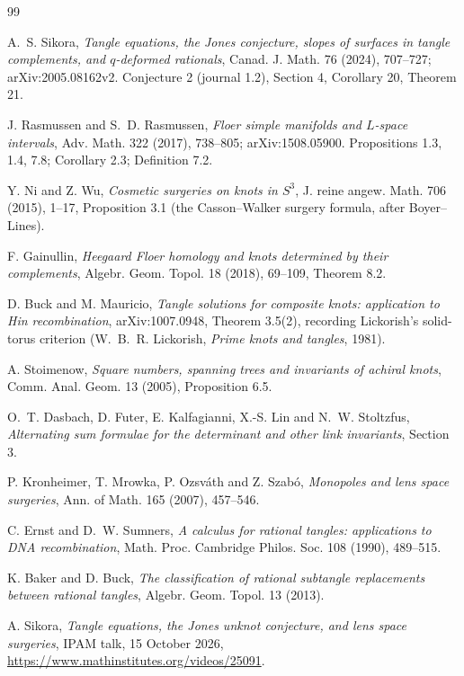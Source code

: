 \documentclass[11pt]{amsart}
\theoremstyle{remark}
\begin{document}
\begin{thebibliography}{99}

 A.~S. Sikora, \emph{Tangle equations, the Jones conjecture, slopes of surfaces in tangle complements, and $q$-deformed rationals}, Canad. J. Math. 76 (2024), 707--727; arXiv:2005.08162v2. Conjecture 2 (journal 1.2), Section 4, Corollary 20, Theorem 21.

 J. Rasmussen and S.~D. Rasmussen, \emph{Floer simple manifolds and $L$-space intervals}, Adv. Math. 322 (2017), 738--805; arXiv:1508.05900. Propositions 1.3, 1.4, 7.8; Corollary 2.3; Definition 7.2.

 Y. Ni and Z. Wu, \emph{Cosmetic surgeries on knots in $S^3$}, J. reine angew. Math. 706 (2015), 1--17, Proposition 3.1 (the Casson--Walker surgery formula, after Boyer--Lines).

 F. Gainullin, \emph{Heegaard Floer homology and knots determined by their complements}, Algebr. Geom. Topol. 18 (2018), 69--109, Theorem 8.2.

 D. Buck and M. Mauricio, \emph{Tangle solutions for composite knots: application to Hin recombination}, arXiv:1007.0948, Theorem 3.5(2), recording Lickorish's solid-torus criterion (W.~B.~R. Lickorish, \emph{Prime knots and tangles}, 1981).

 A. Stoimenow, \emph{Square numbers, spanning trees and invariants of achiral knots}, Comm. Anal. Geom. 13 (2005), Proposition 6.5.

 O.~T. Dasbach, D. Futer, E. Kalfagianni, X.-S. Lin and N.~W. Stoltzfus, \emph{Alternating sum formulae for the determinant and other link invariants}, Section 3.

 P. Kronheimer, T. Mrowka, P. Ozsv\'ath and Z. Szab\'o, \emph{Monopoles and lens space surgeries}, Ann. of Math. 165 (2007), 457--546.

 C. Ernst and D.~W. Sumners, \emph{A calculus for rational tangles: applications to DNA recombination}, Math. Proc. Cambridge Philos. Soc. 108 (1990), 489--515.

 K. Baker and D. Buck, \emph{The classification of rational subtangle replacements between rational tangles}, Algebr. Geom. Topol. 13 (2013).

 A. Sikora, \emph{Tangle equations, the Jones unknot conjecture, and lens space surgeries}, IPAM talk, 15 October 2026, \url{https://www.mathinstitutes.org/videos/25091}.

\end{thebibliography}
\end{document}
